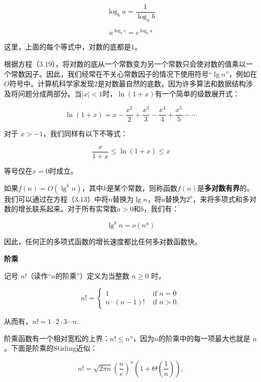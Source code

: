 \documentclass[lang=cn,newtx,10pt,scheme=chinese]{elegantbook}
\begin{document}
\begin{equation}
\log _b a=\frac{1}{\log _a b}
\end{equation}

\begin{equation}
a^{\log _b c}=c^{\log _b a}
\end{equation}

这里，上面的每个等式中，对数的底都是1。

根据方程（3.19），将对数的底从一个常数变为另一个常数只会使对数的值乘以一个常数因子。因此，我们经常在不关心常数因子的情况下使用符号“$\lg n$”，例如在$O$符号中。计算机科学家发现2是对数最自然的底数，因为许多算法和数据结构涉及将问题分成两部分。当$|x|<1$时，$\ln (1+x)$有一个简单的级数展开式：

\begin{equation}
\ln (1+x)=x-\frac{x^2}{2}+\frac{x^3}{3}-\frac{x^4}{4}+\frac{x^5}{5}-\cdots
\end{equation}

对于 $x>-1$，我们同样有以下不等式：

\begin{equation}
\frac{x}{1+x} \leq \ln (1+x) \leq x
\end{equation}

等号仅在$x=0$时成立。

如果$f(n)=O\left(\lg ^k n\right)$，其中$k$是某个常数，则称函数$f(n)$是\textbf{多对数有界}的。我们可以通过在方程（3.13）中将$n$替换为$\lg n$，将$a$替换为$2^a$，来将多项式和多对数的增长联系起来。对于所有实常数$a>0$和$b$，我们有：

\begin{equation}
\lg ^b n=o\left(n^a\right)
\end{equation}

因此，任何正的多项式函数的增长速度都比任何多对数函数快。

\textbf{阶乘}

记号 $n!$（读作``$n$的阶乘''）定义为当整数 $n \geq 0$ 时，

$$
n != \begin{cases}1 & \text { if } n=0 \\ n \cdot(n-1) ! & \text { if } n>0 .\end{cases}
$$

从而有，$n !=1 \cdot 2 \cdot 3 \cdots n$.

阶乘函数有一个相对宽松的上界：$n ! \leq n^n$，因为$n$的阶乘中的每一项最大也就是 $n$。下面是阶乘的Stirling近似：

\begin{equation}
n !=\sqrt{2 \pi n}\left(\frac{n}{e}\right)^n\left(1+\Theta\left(\frac{1}{n}\right)\right),
\end{equation}
\end{document}
